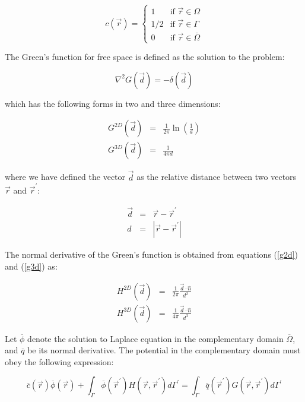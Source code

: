 \documentclass[12pt]{report}
\begin{document}
\begin{equation}c(\vec{r})=\left\{\begin{array}{ll}1 & \textrm{if $\vec{r}\in\Omega$}\\1/2 & \textrm{if $\vec{r}\in\Gamma$}\\0 & \textrm{if $\vec{r}\in\overline{\Omega}$}\end{array}\right.\end{equation}

The Green's function for free space is defined as the solution to the problem:

\begin{equation}\nabla^2G(\vec{d})=-\delta(\vec{d})\end{equation}

which has the following forms in two and three dimensions:

\begin{eqnarray}
 G^{2D}(\vec{d}) &=& \frac{1}{2\pi}\ln\left(\frac{1}{d}\right)\label{g2d}\\
 G^{3D}(\vec{d}) &=& \frac{1}{4\pi d}\label{g3d}
\end{eqnarray}

where we have defined the vector $\vec{d}$ as the relative distance between two vectors $\vec{r}$ and $\vec{r}^\prime$:

\begin{eqnarray}
 \vec{d} &=& \vec{r}-\vec{r}^\prime\\
 d &=& |\vec{r}-\vec{r}^\prime|
\end{eqnarray}

The normal derivative of the Green's function is obtained from equations (\ref{g2d}) and (\ref{g3d}) as:

\begin{eqnarray}
 H^{2D}(\vec{d}) &=& \frac{1}{2\pi}\frac{\vec{d}\cdot\hat{n}}{d^2}\label{h2d}\\
 H^{3D}(\vec{d}) &=& \frac{1}{4\pi}\frac{\vec{d}\cdot\hat{n}}{d^3}\label{h3d}
\end{eqnarray}

Let $\overline{\phi}$ denote the solution to Laplace equation in the complementary domain $\overline{\Omega}$, and $\overline{q}$ be its normal derivative. The potential in the complementary domain must obey the following expression:

\begin{equation}\overline{c}(\vec{r})\overline{\phi}(\vec{r})+\int_\Gamma{\overline{\phi}(\vec{r}^\prime)H(\vec{r},\vec{r}^\prime)d\Gamma^\prime}=\int_\Gamma{\overline{q}(\vec{r}^\prime)G(\vec{r},\vec{r}^\prime)d\Gamma^\prime}\label{dbem_out}\end{equation}
\end{document}
